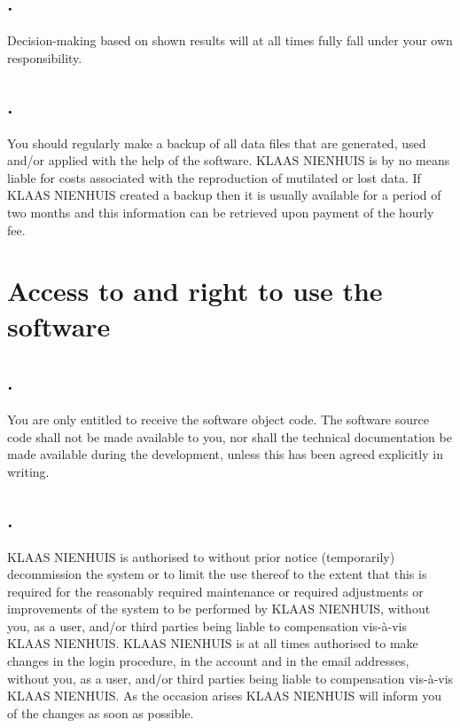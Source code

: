 \documentclass[letterpaper,10pt,english]{sphinxmanual}
\begin{document}
\section{.}
\label{Development:id10}
Decision-making based on shown results will at all times fully fall under your own responsibility.


\section{.}
\label{Development:id11}
You should regularly make a backup of all data files that are generated, used and/or applied with the help of the software. KLAAS NIENHUIS is by no means liable for costs associated with the reproduction of mutilated or lost data. If KLAAS NIENHUIS created a backup then it is usually available for a period of two months and this information can be retrieved upon payment of the hourly fee.


\chapter{Access to and right to use the software}
\label{Access::doc}\label{Access:access-to-and-right-to-use-the-software}

\section{.}
\label{Access:id1}
You are only entitled to receive the software object code. The software source code shall not be made available to you, nor shall the technical documentation be made available during the development, unless this has been agreed explicitly in writing.


\section{.}
\label{Access:id2}
KLAAS NIENHUIS is authorised to without prior notice (temporarily) decommission the system or to limit the use thereof to the extent that this is required for the reasonably required maintenance or required adjustments or improvements of the system to be performed by KLAAS NIENHUIS, without you, as a user, and/or third parties being liable to compensation vis-à-vis KLAAS NIENHUIS. KLAAS NIENHUIS is at all times authorised to make changes in the login procedure, in the account and in the email addresses, without you, as a user, and/or third parties being liable to compensation vis-à-vis KLAAS NIENHUIS. As the occasion arises KLAAS NIENHUIS will inform you of the changes as soon as possible.
\end{document}
